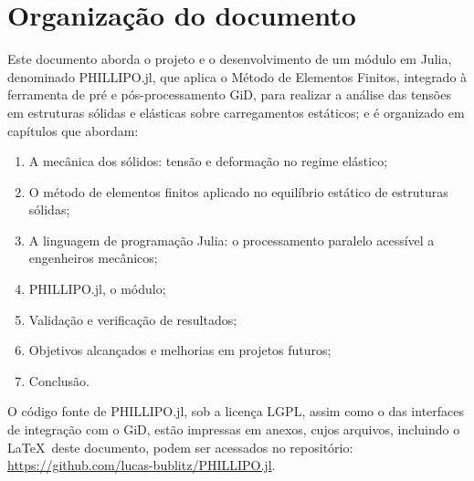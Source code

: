 \section{Organização do documento}

Este documento aborda o projeto e o desenvolvimento de um módulo em Julia, denominado PHILLIPO.jl, que aplica o Método de Elementos Finitos, integrado à ferramenta de pré e pós-processamento GiD, para realizar a análise das tensões em estruturas sólidas e elásticas sobre carregamentos estáticos; e é organizado em capítulos que abordam:

\begin{enumerate}
    \item A mecânica dos sólidos: tensão e deformação no regime elástico;
    \item O método de elementos finitos aplicado no equilíbrio estático de estruturas sólidas;
    \item A linguagem de programação Julia: o processamento paralelo acessível a engenheiros mecânicos;
    \item PHILLIPO.jl, o módulo;
    \item Validação e verificação de resultados;
    \item Objetivos alcançados e melhorias em projetos futuros;
    \item Conclusão.
\end{enumerate}

O código fonte de PHILLIPO.jl, sob a licença LGPL, assim como o das interfaces de integração com o GiD, estão impressas em anexos, cujos arquivos, incluindo o \LaTeX\ deste documento, podem ser acessados no repositório: \url{https://github.com/lucas-bublitz/PHILLIPO.jl}.